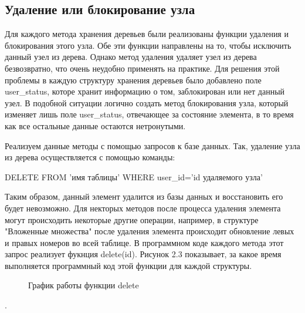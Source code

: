 \documentclass[a4paper,14pt]{extreport}
\theoremstyle{definition}
\begin{document}
\subsection{Удаление или блокирование узла}
Для каждого метода хранения деревьев были реализованы функции удаления и блокирования этого узла. Обе эти функции направлены на то, чтобы исключить данный узел из дерева. Однако метод удаления удаляет узел из дерева безвозвратно, что очень неудобно применять на практике. Для решения этой проблемы в каждую структуру хранения деревьев было добавлено поле user\_status, которе  хранит информацию о том, заблокирован или нет данный узел. В подобной ситуации логично создать метод блокирования узла, который изменяет лишь поле user\_status, отвечающее за состояние элемента, в то время как все остальные данные остаются нетронутыми.

Реализуем данные методы с помощью запросов к базе данных. Так, удаление узла из дерева осуществляется с помощью команды:

DELETE FROM 'имя таблицы' WHERE user\_id='id удаляемого узла'

Таким образом, данный элемент удалится из базы данных и восстановить его будет невозможно. Для некторых методов после процесса удаления элемента могут происходить некоторые другие операции, например, в структуре "Вложенные множества" после удаления элемента происходит обновление левых и правых номеров во всей таблице. В программном коде каждого метода этот запрос реализует фукнция delete(\textdollar id). Рисунок 2.3 показывает, за какое время выполняется программный код этой функции для каждой структуры. 

\begin{figure}
\caption{График работы функции delete}
\label{fig:3}
\end{figure}.
\end{document}
